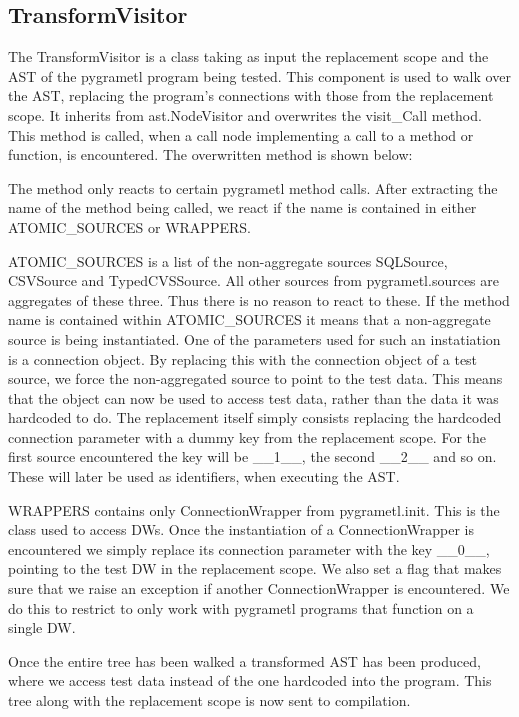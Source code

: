 \subsection{TransformVisitor}
The TransformVisitor is a class taking as input the replacement scope and the AST of the pygrametl program being tested. This component is used to walk over the AST, replacing the program's connections with those from the replacement scope.  It  inherits from ast.NodeVisitor and overwrites the visit\_Call method. This method is called, when a call node implementing  a call to a method or function, is encountered. The overwritten method is shown below:



The method only reacts to certain pygrametl method calls. After extracting the name of the method being called, we react if the name is contained in either ATOMIC\_SOURCES or WRAPPERS.

 ATOMIC\_SOURCES  is a list of the non-aggregate sources  SQLSource, CSVSource and TypedCVSSource. All other sources from pygrametl.sources are aggregates of these three. Thus there is no reason to react to these. If the method name is contained within ATOMIC\_SOURCES it means that a non-aggregate source is being instantiated. One of the parameters used for such an instatiation is a connection object. By replacing this with the connection object of a test source, we force the non-aggregated source to point to the test data. This means that the object can now be used to access test data, rather than the data it was hardcoded to do. The replacement itself simply consists replacing the hardcoded connection parameter with a dummy key from the replacement scope. For the first source encountered the key will be \_\_1\_\_, the second \_\_2\_\_ and so on. These will later be used as identifiers, when executing the AST. 

WRAPPERS contains only ConnectionWrapper from pygrametl.init. This is the class used to access DWs. Once the instantiation of a ConnectionWrapper is encountered we simply replace its connection parameter with the key \_\_0\_\_, pointing to the test DW in the replacement scope. We also set a flag that makes sure that we raise an exception if another ConnectionWrapper is encountered. We do this to restrict \FW{} to only work with pygrametl programs that function on a single DW.

Once the entire tree has been walked a transformed AST has been produced, where we access test data instead of the one hardcoded into the program. This tree along with the replacement scope is now sent to compilation. 


